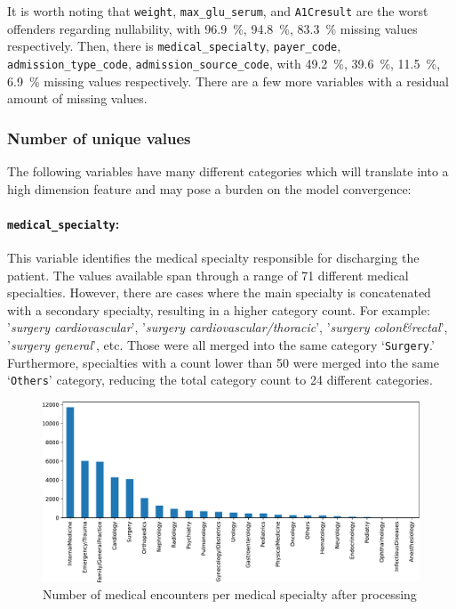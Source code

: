\documentclass[a4paper,11pt]{article}
\newcommand{\weight}{\texttt{weight}\xspace}
\newcommand{\admissionTypeCode}{\texttt{admission\_type\_code}\xspace}
\newcommand{\admissionSourceCode}{\texttt{admission\_source\_code}\xspace}
\newcommand{\payerCode}{\texttt{payer\_code}\xspace}
\newcommand{\medicalSpecialty}{\texttt{medical\_specialty}\xspace}
\newcommand{\maxGluSerum}{\texttt{max\_glu\_serum}\xspace}
\newcommand{\AOneCresult}{\texttt{A1Cresult}\xspace}
\begin{document}
It is worth noting that \weight, \maxGluSerum, and \AOneCresult are the worst offenders regarding nullability, with \SI{96.9}{\percent}, \SI{94.8}{\percent}, \SI{83.3}{\percent} missing values respectively.  Then, there is \medicalSpecialty, \payerCode, \admissionTypeCode, \admissionSourceCode, with \SI{49.2}{\percent}, \SI{39.6}{\percent}, \SI{11.5}{\percent}, \SI{6.9}{\percent} missing values respectively. There are a few more variables with a residual amount of missing values. 


\subsubsection{Number of unique values}

The following variables have many different categories which will translate into a high dimension feature and may pose a burden on the model convergence:

\paragraph{\medicalSpecialty:}
This variable identifies the medical specialty responsible for discharging the patient. The values available span through a range of \SI{71}{} different medical specialties. However, there are cases where the main specialty is concatenated with a secondary specialty, resulting in a higher category count. For example: '\textit{surgery cardiovascular}', '\textit{surgery cardiovascular/thoracic}', '\textit{surgery colon\&rectal}', '\textit{surgery general}', etc. Those were all merged into the same category ‘\texttt{Surgery}.’ Furthermore, specialties with a count lower than \SI{50}{} were merged into the same ‘\texttt{Others}’ category, reducing the total category count to \SI{24}{} different categories.

\begin{figure}[htb]
	\centering
	\includegraphics[width=1\textwidth]{images/medical_specialty_cardinality.pdf}
	\caption{Number of medical encounters per medical specialty after processing}
	\label{fig:medical_specialty_cardinality}
\end{figure}
\end{document}
